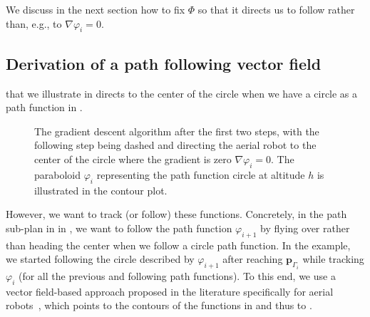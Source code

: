 We discuss in the next section how to fix $\varPhi$ so that it directs us to follow  rather than, e.g., to $\nabla\varphi_i=0$.

\subsection{Derivation of a path following vector field}

 that we illustrate in  directs to the center of the circle when we have a circle as a path function in .
\begin{figure}[h!]
  \centering
  \selectfont
  
  \caption[The gradient descent algorithm illustrated on a circle path function]{The gradient descent algorithm after the first two steps, with the following step being dashed and directing the aerial robot to the center of the circle where the gradient is zero $\nabla\varphi_i=0$. The paraboloid $\varphi_i$ representing the path function circle at altitude $h$ is illustrated in the contour plot.}
  \label{fig:grad_desc}
\end{figure}
However, we want to track (or follow) these functions. Concretely, in the path sub-plan in  in , we want to follow the path function $\varphi_{i+1}$ by flying over rather than heading the center when we follow a circle path function. In the example, we started following the circle described by $\varphi_{i+1}$ after reaching $\mathbf{p}_{\Gamma_i}$ while tracking $\varphi_i$ (for all the previous and following path functions). To this end, we use a vector field-based approach proposed in the literature specifically for aerial robots~\citep{de2017guidance}, which points to the contours of the functions in  and thus to .


